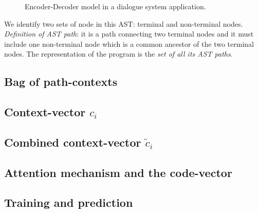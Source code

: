 \begin{figure}[H]
 \centering
 \caption[Encoder-Decoder model in a dialogue system application.]{Encoder-Decoder model in a dialogue system application. }
    \label{fig:AST-graphviz}
\end{figure}

	
We identify two sets of node in this AST: terminal and non-terminal nodes.
\textit{Definition of AST path}: it is a path connecting two terminal nodes and it must include one non-terminal node which is a common ancestor of the two terminal nodes. 
The representation of the program is the \textit{set of all its AST paths}.








\subsection{Bag of path-contexts}

\subsection{Context-vector $c_i$}

\subsection{Combined context-vector $\widetilde{c}_i$}

\subsection{Attention mechanism and the code-vector}

\subsection{Training and prediction}



